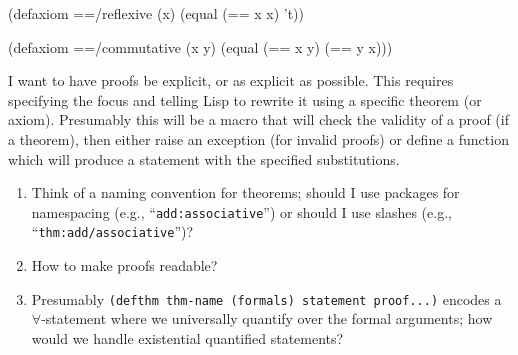 \begin{code}[name=axioms]
(defaxiom ==/reflexive (x)
  (equal (== x x) 't))

(defaxiom ==/commutative (x y)
  (equal (== x y) (== y x)))
\end{code}

  
I want to have proofs be explicit, or as explicit as possible. This
requires specifying the focus and telling Lisp to rewrite it using a
specific theorem (or axiom). Presumably this will be a macro that will
check the validity of a proof (if a theorem), then either raise an
exception (for invalid proofs) or define a function which will produce a
statement with the specified substitutions.
\begin{enumerate}
\item Think of a naming convention for theorems; should I use packages
  for namespacing (e.g., ``\lstinline[language=lisp]{add:associative}'')
  or should I use slashes (e.g., ``\lstinline[language=lisp]{thm:add/associative}'')?
\item How to make proofs readable? 
\item Presumably \lstinline[language=lisp]{(defthm thm-name (formals) statement proof...)}
  encodes a $\forall$-statement where we universally quantify over the
  formal arguments; how would we handle existential quantified statements?
\end{enumerate}

